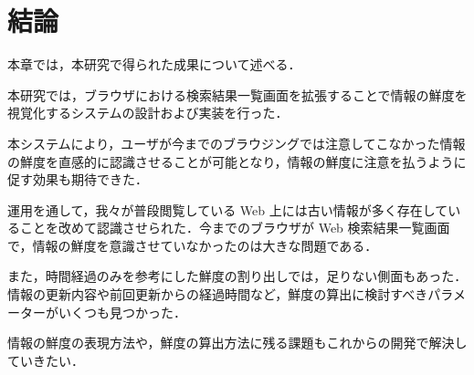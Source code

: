 \chapter{結論}
\label{chap:conclusion}

本章では，本研究で得られた成果について述べる．

\newpage

本研究では，ブラウザにおける検索結果一覧画面を拡張することで情報の鮮度を視覚化するシステムの設計および実装を行った．

本システムにより，ユーザが今までのブラウジングでは注意してこなかった情報の鮮度を直感的に認識させることが可能となり，情報の鮮度に注意を払うように促す効果も期待できた．

運用を通して，我々が普段閲覧している Web 上には古い情報が多く存在していることを改めて認識させられた．今までのブラウザが Web 検索結果一覧画面で，情報の鮮度を意識させていなかったのは大きな問題である．

また，時間経過のみを参考にした鮮度の割り出しでは，足りない側面もあった．情報の更新内容や前回更新からの経過時間など，鮮度の算出に検討すべきパラメーターがいくつも見つかった．

情報の鮮度の表現方法や，鮮度の算出方法に残る課題もこれからの開発で解決していきたい．
